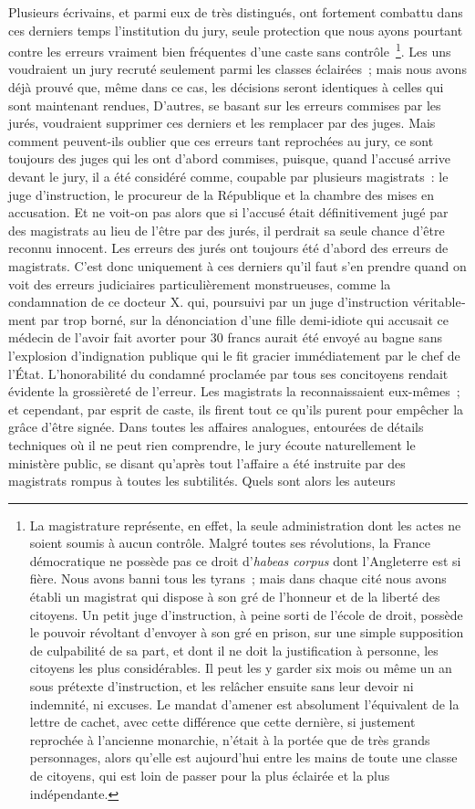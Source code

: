 \documentclass[french,twoside]{book} %
\begin{document}
Plusieurs écrivains, et parmi eux de très distingués, ont fortement combattu dans ces derniers temps l’institution du jury, seule protection que nous ayons pour­tant contre les erreurs vraiment bien fréquentes d’une caste sans contrôle \footnote{La magistrature représente, en effet, la seule administration dont les actes ne soient soumis à aucun contrôle. Malgré toutes ses révolutions, la France démocratique ne possède pas ce droit d’\emph{habeas corpus} dont l’Angleterre est si fière. Nous avons banni tous les tyrans ; mais dans chaque cité nous avons établi un magistrat qui dispose à son gré de l’honneur et de la liberté des citoyens. Un petit juge d’instruction, à peine sorti de l’école de droit, possède le pouvoir révoltant d’envoyer à son gré en prison, sur une simple supposition de culpabilité de sa part, et dont il ne doit la justifi­cation à personne, les citoyens les plus considérables. Il peut les y garder six mois ou même un an sous prétexte d’instruction, et les relâcher ensuite sans leur devoir ni indemnité, ni excuses. Le mandat d’amener est absolument l’équivalent de la lettre de cachet, avec cette différence que cette dernière, si justement reprochée à l’ancienne monarchie, n’était à la portée que de très grands personnages, alors qu’elle est aujourd’hui entre les mains de toute une classe de citoyens, qui est loin de passer pour la plus éclairée et la plus indépendante.}. Les uns vou­draient un jury recruté seulement parmi les classes éclairées ; mais nous avons déjà prouvé que, même dans ce cas, les décisions seront identiques à celles qui sont main­tenant rendues, D’autres, se basant sur les erreurs commises par les jurés, voudraient supprimer ces derniers et les remplacer par des juges. Mais comment peuvent-ils oublier que ces erreurs tant reprochées au jury, ce sont toujours des juges qui les ont d’abord commises, puisque, quand l’accusé arrive devant le jury, il a été considéré comme, coupable par plusieurs magistrats : le juge d’instruction, le procureur de la République et la chambre des mises en accusation. Et ne voit-on pas alors que si l’accusé était définitivement jugé par des magistrats au lieu de l’être par des jurés, il perdrait sa seule chance d’être reconnu innocent. Les erreurs des jurés ont toujours été d’abord des erreurs de magistrats. C’est donc uniquement à ces derniers qu’il faut s’en prendre quand on voit des erreurs judiciaires particulièrement monstrueuses, comme la condamnation de ce docteur X. qui, poursuivi par un juge d’instruction véritable­ment par trop borné, sur la dénonciation d’une fille demi-idiote qui accusait ce méde­cin de l’avoir fait avorter pour 30 francs aurait été envoyé au bagne sans l’explosion d’indignation publique qui le fit gracier immédiatement par le chef de l’État. L’hono­rabilité du condamné proclamée par tous ses concitoyens rendait évidente la grossiè­reté de l’erreur. Les magistrats la reconnaissaient eux-mêmes ; et cependant, par esprit de caste, ils firent tout ce qu’ils purent pour empêcher la grâce d’être signée. Dans toutes les affaires analogues, entourées de détails techniques où il ne peut rien com­prendre, le jury écoute naturellement le ministère public, se disant qu’après tout l’affaire a été instruite par des magistrats rompus à toutes les subtilités. Quels sont alors les auteurs 
\end{document}
